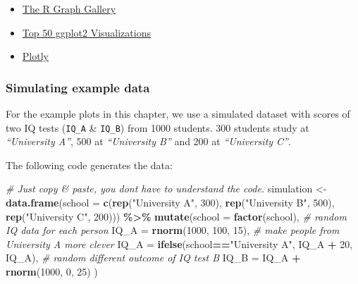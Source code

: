\documentclass[
]{scrartcl}
\newenvironment{Shaded}{\begin{snugshade}}{\end{snugshade}}
\newcommand{\AttributeTok}[1]{\textcolor[rgb]{0.13,0.29,0.53}{#1}}
\newcommand{\CommentTok}[1]{\textcolor[rgb]{0.56,0.35,0.01}{\textit{#1}}}
\newcommand{\DecValTok}[1]{\textcolor[rgb]{0.00,0.00,0.81}{#1}}
\newcommand{\FunctionTok}[1]{\textcolor[rgb]{0.13,0.29,0.53}{\textbf{#1}}}
\newcommand{\NormalTok}[1]{#1}
\newcommand{\OtherTok}[1]{\textcolor[rgb]{0.56,0.35,0.01}{#1}}
\newcommand{\SpecialCharTok}[1]{\textcolor[rgb]{0.81,0.36,0.00}{\textbf{#1}}}
\newcommand{\StringTok}[1]{\textcolor[rgb]{0.31,0.60,0.02}{#1}}
\providecommand{\tightlist}{%
  \setlength{\itemsep}{0pt}\setlength{\parskip}{0pt}}
\begin{document}
\begin{itemize}
\tightlist
\item
  \href{http://www.r-graph-gallery.com/}{The R Graph Gallery}
\item
  \href{http://r-statistics.co/Top50-Ggplot2-Visualizations-MasterList-R-Code.html}{Top 50 ggplot2 Visualizations}
\item
  \href{https://plotly.com/ggplot2/}{Plotly}
\end{itemize}

\hypertarget{simulating-example-data}{%
\subsubsection*{Simulating example data}\label{simulating-example-data}}

For the example plots in this chapter, we use a simulated dataset with scores of two IQ tests (\texttt{IQ\_A} \& \texttt{IQ\_B}) from 1000 students. 300 students study at \emph{``University A''}, 500 at \emph{``University B''} and 200 at \emph{``University C''}.

The following code generates the data:

\begin{Shaded}
\begin{Highlighting}[]
\CommentTok{\# Just copy \& paste, you don\textquotesingle{}t have to understand the code.}
\NormalTok{simulation }\OtherTok{\textless{}{-}} \FunctionTok{data.frame}\NormalTok{(}\AttributeTok{school =} \FunctionTok{c}\NormalTok{(}\FunctionTok{rep}\NormalTok{(}\StringTok{"University A"}\NormalTok{, }\DecValTok{300}\NormalTok{),}
                              \FunctionTok{rep}\NormalTok{(}\StringTok{"University B"}\NormalTok{, }\DecValTok{500}\NormalTok{),}
                              \FunctionTok{rep}\NormalTok{(}\StringTok{"University C"}\NormalTok{, }\DecValTok{200}\NormalTok{))) }\SpecialCharTok{\%\textgreater{}\%}
        \FunctionTok{mutate}\NormalTok{(}\AttributeTok{school =} \FunctionTok{factor}\NormalTok{(school),}
             \CommentTok{\# random IQ data for each person}
             \AttributeTok{IQ\_A =} \FunctionTok{rnorm}\NormalTok{(}\DecValTok{1000}\NormalTok{, }\DecValTok{100}\NormalTok{, }\DecValTok{15}\NormalTok{),}
             \CommentTok{\# make people from University A more clever}
             \AttributeTok{IQ\_A =} \FunctionTok{ifelse}\NormalTok{(school}\SpecialCharTok{==}\StringTok{"University A"}\NormalTok{, IQ\_A }\SpecialCharTok{+} \DecValTok{20}\NormalTok{, IQ\_A),}
             \CommentTok{\# random different outcome of IQ test B}
             \AttributeTok{IQ\_B =}\NormalTok{ IQ\_A }\SpecialCharTok{+} \FunctionTok{rnorm}\NormalTok{(}\DecValTok{1000}\NormalTok{, }\DecValTok{0}\NormalTok{, }\DecValTok{25}\NormalTok{) )}
\end{Highlighting}
\end{Shaded}
\end{document}
